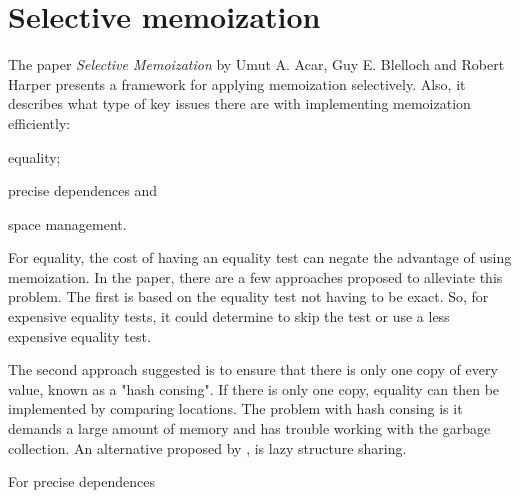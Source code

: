 \section{Selective memoization}

The paper \textit{Selective Memoization} by Umut A. Acar, Guy E. Blelloch and Robert Harper\cite{acar2003selective} presents a framework for applying memoization selectively. Also, it describes what type of key issues there are with implementing memoization efficiently:
\begin{enumerate*}[label={(\Alph*)}]
    \item equality; 
    \item precise dependences and 
    \item space management.
\end{enumerate*}

For equality, the cost of having an equality test can negate the advantage of using memoization. In the paper, there are a few approaches proposed to alleviate this problem. The first is based on the equality test not having to be exact. So, for expensive equality tests, it could determine to skip the test or use a less expensive equality test. 

The second approach suggested is to ensure that there is only one copy of every value, known as a "hash consing". If there is only one copy, equality can then be implemented by comparing locations. The problem with hash consing is it demands a large amount of memory and has trouble working with the garbage collection. An alternative proposed by \cite{pugh1989incremental}, is lazy structure sharing.

For precise dependences

